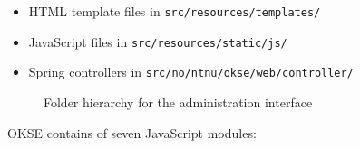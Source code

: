\begin{itemize}
\item HTML template files in \verb!src/resources/templates/!
\item JavaScript files in \verb!src/resources/static/js/!
\item Spring controllers in \verb!src/no/ntnu/okse/web/controller/! 
\end{itemize}

\begin{center}
  \begin{figure}[ht!]
    \caption{Folder hierarchy for the administration interface}
    \label{fig:oac-folder-hierarchy}
  \end{figure}
\end{center}

\noindent OKSE contains of seven JavaScript modules: 

